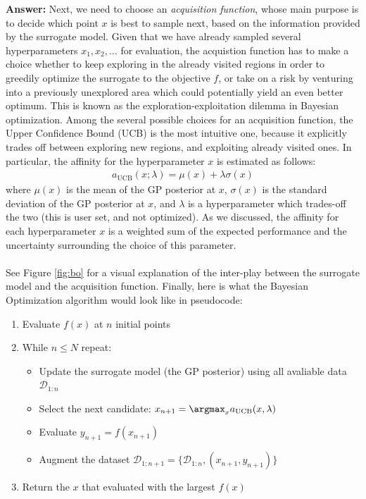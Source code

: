 \documentclass{article}
\newenvironment{QandA}{\begin{enumerate}[label=\arabic*.]}{\end{enumerate}}
\newenvironment{InnerQandA}{\begin{enumerate}[label=\roman*.]}{\end{enumerate}}
\newenvironment{answer}{\par\normalfont \textbf{Answer:}}{}
\begin{document}
\begin{QandA}
\begin{InnerQandA}
\begin{answer}
            Next, we need to choose an \textit{acquisition function}, whose main purpose is to decide which point $x$ is best to sample next, based on the information provided by the surrogate model. Given that we have already sampled several hyperparameters $x_1, x_2, \ldots$ for evaluation, the acquistion function has to make a choice whether to keep exploring in the already visited regions in order to greedily optimize the surrogate to the objective $f$, or take on a risk by venturing into a previously unexplored area which could potentially yield an even better optimum. This is known as the exploration-exploitation dilemma in Bayesian optimization. Among the several possible choices for an acquisition function, the Upper Confidence Bound (UCB) is the most intuitive one, because it explicitly trades off between exploring new regions, and exploiting already visited ones. In particular, the affinity for the hyperparameter $x$ is estimated as follows:
            \begin{align*}
                a_{\text{UCB}}(x; \lambda) = \mu(x) + \lambda \sigma(x)
            \end{align*}
            where $\mu(x)$ is the mean of the GP posterior at $x$, $\sigma(x)$ is the standard deviation of the GP posterior at $x$, and $\lambda$ is a hyperparameter which trades-off the two (this is user set, and not optimized). As we discussed, the affinity for each hyperparameter $x$ is a weighted sum of the expected performance and the uncertainty surrounding the choice of this parameter. \\\\
            See Figure \ref{fig:bo} for a visual explanation of the inter-play between the surrogate model and the acquisition function. Finally, here is what the Bayesian Optimization algorithm would look like in pseudocode:
            \begin{enumerate}[label={\arabic*.}]
                \item Evaluate $f(x)$ at $n$ initial points 
                \item While $n \le N$ repeat:
                \begin{itemize}
                    \item Update the surrogate model (the GP posterior) using all avaliable data $\mathcal{D}_{1:n}$ 
                    \item Select the next candidate: $x_{n+1} = \argmax_{x}a_{\text{UCB}}(x, \lambda)$
                    \item Evaluate $y_{n+1} = f(x_{n+1})$ 
                    \item Augment the dataset $\mathcal{D}_{1:n+1} = \{ \mathcal{D}_{1:n}, (x_{n+1}, y_{n+1}) \}$
                \end{itemize}
            \item Return the $x$ that evaluated with the largest $f(x)$
        \end{enumerate}


\end{answer}
\end{InnerQandA}
\end{QandA}
\end{document}
